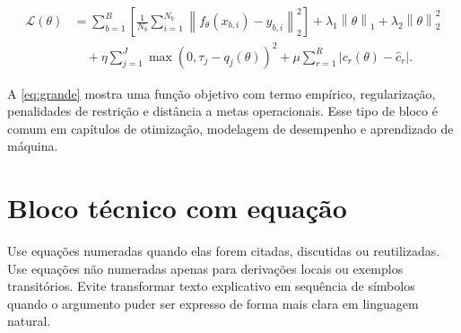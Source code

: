 \begin{align}
\label{eq:grande}
\mathcal{L}(\theta) &=
\sum_{b=1}^{B}\left[
  \frac{1}{N_b}\sum_{i=1}^{N_b}
  \left\| f_{\theta}(x_{b,i}) - y_{b,i} \right\|_2^2
\right]
+ \lambda_1\left\|\theta\right\|_1
+ \lambda_2\left\|\theta\right\|_2^2 \\
&\quad + \eta\sum_{j=1}^{J}
\max\left(0,\tau_j - q_j(\theta)\right)^2
+ \mu\sum_{r=1}^{R}
\left| c_r(\theta)-\widehat{c}_r \right|.
\end{align}

A \cref{eq:grande} mostra uma função objetivo com termo empírico, regularização, penalidades de restrição e distância a metas operacionais. Esse tipo de bloco é comum em capítulos de otimização, modelagem de desempenho e aprendizado de máquina.

\section{Bloco técnico com equação}

\begin{VSNote}[title={Regra editorial para matemática}]
Use equações numeradas quando elas forem citadas, discutidas ou reutilizadas. Use equações não numeradas apenas para derivações locais ou exemplos transitórios. Evite transformar texto explicativo em sequência de símbolos quando o argumento puder ser expresso de forma mais clara em linguagem natural.
\end{VSNote}
